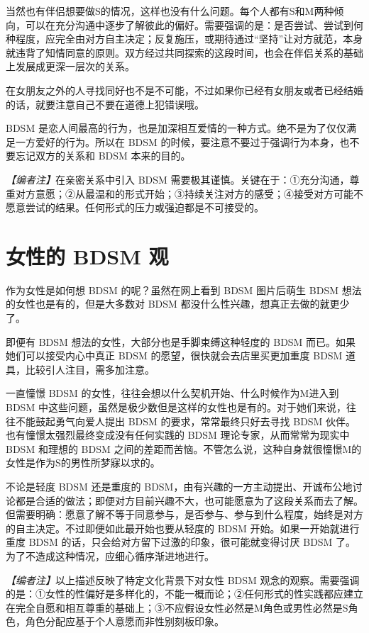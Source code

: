 \documentclass[12pt,UTF8]{ctexbook}
\begin{document}
当然也有伴侣想要做S的情况，这样也没有什么问题。每个人都有S和M两种倾向，可以在充分沟通中逐步了解彼此的偏好。需要强调的是：是否尝试、尝试到何种程度，应完全由对方自主决定；反复施压，或期待通过“坚持”让对方就范，本身就违背了知情同意的原则。双方经过共同探索的这段时间，也会在伴侣关系的基础上发展成更深一层次的关系。

在女朋友之外的人寻找同好也不是不可能，不过如果你已经有女朋友或者已经结婚的话，就要注意自己不要在道德上犯错误哦。

BDSM 是恋人间最高的行为，也是加深相互爱情的一种方式。绝不是为了仅仅满足一方爱好的行为。所以在 BDSM 的时候，要注意不要过于强调行为本身，也不要忘记双方的关系和 BDSM 本来的目的。

\textit{【编者注】}在亲密关系中引入 BDSM 需要极其谨慎。关键在于：①充分沟通，尊重对方意愿；②从最温和的形式开始；③持续关注对方的感受；④接受对方可能不愿意尝试的结果。任何形式的压力或强迫都是不可接受的。

\section{女性的 BDSM 观}

作为女性是如何想 BDSM 的呢？虽然在网上看到 BDSM 图片后萌生 BDSM 想法的女性也是有的，但是大多数对 BDSM 都没什么性兴趣，想真正去做的就更少了。

即便有 BDSM 想法的女性，大部分也是手脚束缚这种轻度的 BDSM 而已。如果她们可以接受内心中真正 BDSM 的愿望，很快就会去店里买更加重度 BDSM 道具，比较引人注目，需多加注意。

一直憧憬 BDSM 的女性，往往会想以什么契机开始、什么时候作为M进入到 BDSM 中这些问题，虽然是极少数但是这样的女性也是有的。对于她们来说，往往不能鼓起勇气向爱人提出 BDSM 的要求，常常最终只好去寻找 BDSM 伙伴。也有憧憬太强烈最终变成没有任何实践的 BDSM 理论专家，从而常常为现实中 BDSM 和理想的 BDSM 之间的差距而苦恼。不管怎么说，这种自身就很憧憬M的女性是作为S的男性所梦寐以求的。

不论是轻度 BDSM 还是重度的 BDSM，由有兴趣的一方主动提出、开诚布公地讨论都是合适的做法；即便对方目前兴趣不大，也可能愿意为了这段关系而去了解。但需要明确：愿意了解不等于同意参与，是否参与、参与到什么程度，始终是对方的自主决定。不过即便如此最开始也要从轻度的 BDSM 开始。如果一开始就进行重度 BDSM 的话，只会给对方留下过激的印象，很可能就变得讨厌 BDSM 了。为了不造成这种情况，应细心循序渐进地进行。

\textit{【编者注】}以上描述反映了特定文化背景下对女性 BDSM 观念的观察。需要强调的是：①女性的性偏好是多样化的，不能一概而论；②任何形式的性实践都应建立在完全自愿和相互尊重的基础上；③不应假设女性必然是M角色或男性必然是S角色，角色分配应基于个人意愿而非性别刻板印象。
\end{document}
